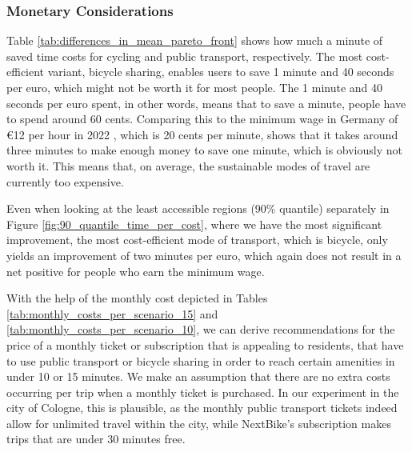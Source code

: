 

\subsubsection{Monetary Considerations}

Table \ref{tab:differences_in_mean_pareto_front} shows how much a minute of saved time costs for cycling and public transport, respectively.
The most cost-efficient variant, bicycle sharing, enables users to save 1 minute and 40 seconds per euro, which might not be worth it for most people.
The 1 minute and 40 seconds per euro spent, in other words, means that to save a minute, people have to spend around 60 cents.
Comparing this to the minimum wage in Germany of \euro{12} per hour in 2022 , which is 20 cents per minute, shows that it takes around three minutes to make enough money to save one minute, which is obviously not worth it.
This means that, on average, the sustainable modes of travel are currently too expensive.

Even when looking at the least accessible regions (90\% quantile) separately in Figure \ref{fig:90_quantile_time_per_cost}, where we have the most significant improvement, the most cost-efficient mode of transport, which is bicycle, only yields an improvement of two minutes per euro, which again does not result in a net positive for people who earn the minimum wage.

With the help of the monthly cost depicted in Tables \ref{tab:monthly_costs_per_scenario_15} and \ref{tab:monthly_costs_per_scenario_10}, we can derive recommendations for the price of a monthly ticket or subscription that is appealing to residents, that have to use public transport or bicycle sharing in order to reach certain amenities in under 10 or 15 minutes.
We make an assumption that there are no extra costs occurring per trip when a monthly ticket is purchased.
In our experiment in the city of Cologne, this is plausible, as the monthly public transport tickets indeed allow for unlimited travel within the city, while NextBike's subscription makes trips that are under 30 minutes free.

